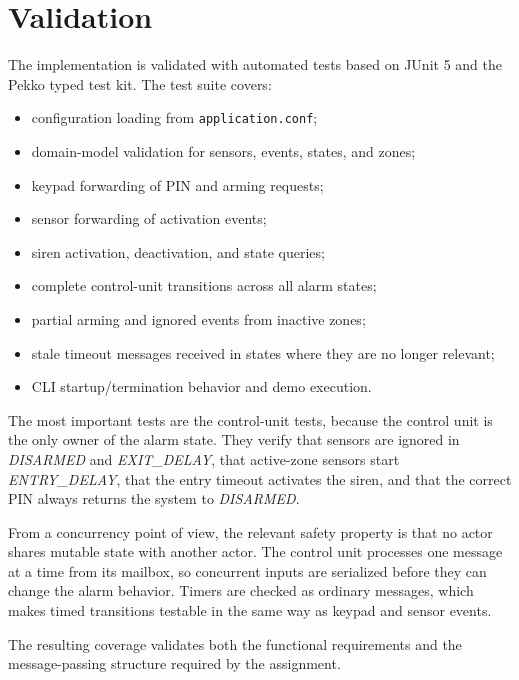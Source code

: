 \section{Validation}

The implementation is validated with automated tests based on JUnit 5 and the Pekko typed test kit.
The test suite covers:
\begin{itemize}
    \item configuration loading from \texttt{application.conf};
    \item domain-model validation for sensors, events, states, and zones;
    \item keypad forwarding of PIN and arming requests;
    \item sensor forwarding of activation events;
    \item siren activation, deactivation, and state queries;
    \item complete control-unit transitions across all alarm states;
    \item partial arming and ignored events from inactive zones;
    \item stale timeout messages received in states where they are no longer relevant;
    \item CLI startup/termination behavior and demo execution.
\end{itemize}

The most important tests are the control-unit tests, because the control unit is the only owner of the alarm state.
They verify that sensors are ignored in \textit{DISARMED} and \textit{EXIT\_DELAY}, that active-zone sensors start
\textit{ENTRY\_DELAY}, that the entry timeout activates the siren, and that the correct PIN always returns the system to
\textit{DISARMED}.

From a concurrency point of view, the relevant safety property is that no actor shares mutable state with another actor.
The control unit processes one message at a time from its mailbox, so concurrent inputs are serialized before they can
change the alarm behavior.
Timers are checked as ordinary messages, which makes timed transitions testable in the same way as keypad and sensor
events.

The resulting coverage validates both the functional requirements and the message-passing structure required by the
assignment.
